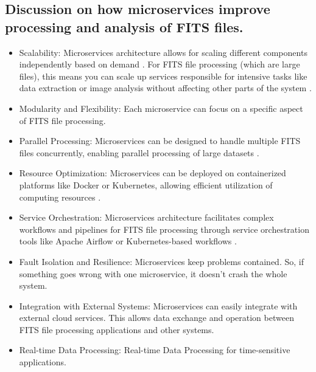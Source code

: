 \documentclass[a4paper,oneside,11pt]{book}
\begin{document}
\subsection{Discussion on how microservices improve processing and analysis of FITS files.}
\begin{itemize}
    \item Scalability: Microservices architecture allows for scaling different components independently based on demand \citep{ferreira2023microservices}. For FITS file processing (which are large files), this means you can scale up services responsible for intensive tasks like data extraction or image analysis without affecting other parts of the system \citep{ferreira2023microservices}.
    \item Modularity and Flexibility: Each microservice can focus on a specific aspect of FITS file processing.
    \item Parallel Processing: Microservices can be designed to handle multiple FITS files concurrently, enabling parallel processing of large datasets \citep{stefanova2024spring}.
    \item Resource Optimization: Microservices can be deployed on containerized platforms like Docker or Kubernetes, allowing efficient utilization of computing resources \citep{h2023containerized}. 
    \item Service Orchestration: Microservices architecture facilitates complex workflows and pipelines for FITS file processing through service orchestration tools like Apache Airflow or Kubernetes-based workflows \citep{dey2023apache}.
    \item Fault Isolation and Resilience: Microservices keep problems contained. So, if something goes wrong with one microservice, it doesn't crash the whole system.
    \item Integration with External Systems: Microservices can easily integrate with external cloud services. This allows data exchange and operation between FITS file processing applications and other systems.
    \item Real-time Data Processing: Real-time Data Processing for time-sensitive applications.
\end{itemize}
\end{document}
